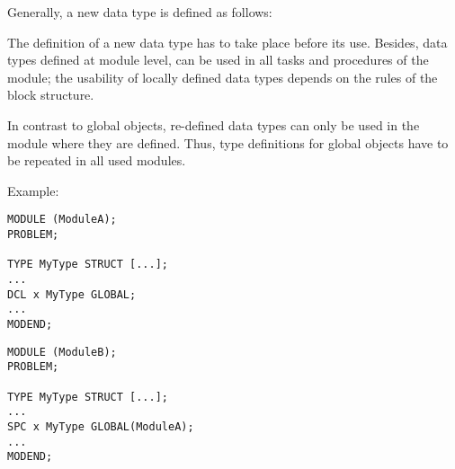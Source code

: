 Generally, a new data type is defined as follows:

\begin{grammarframe}

\end{grammarframe}

The definition of a new data type has to take place before its use.
Besides, data types defined at module level, can be used in all tasks
and procedures of the module; the usability of locally defined data
types depends on the rules of the block structure.

In contrast to global objects, re-defined data types can only be used
in the module where they are defined. Thus, type definitions for
global objects have to be repeated in all used modules.

\begin{minipage}{\linewidth}
Example:
\begin{multicols}{2}
\begin{lstlisting}
MODULE (ModuleA);
PROBLEM;   
             
TYPE MyType STRUCT [...];
...                
DCL x MyType GLOBAL;   
...           
MODEND;     
\end{lstlisting}
\columnbreak
\begin{lstlisting}
MODULE (ModuleB);
PROBLEM;        
           
TYPE MyType STRUCT [...];
...               
SPC x MyType GLOBAL(ModuleA);
...                
MODEND;     
\end{lstlisting}
\end{multicols}
\end{minipage}

